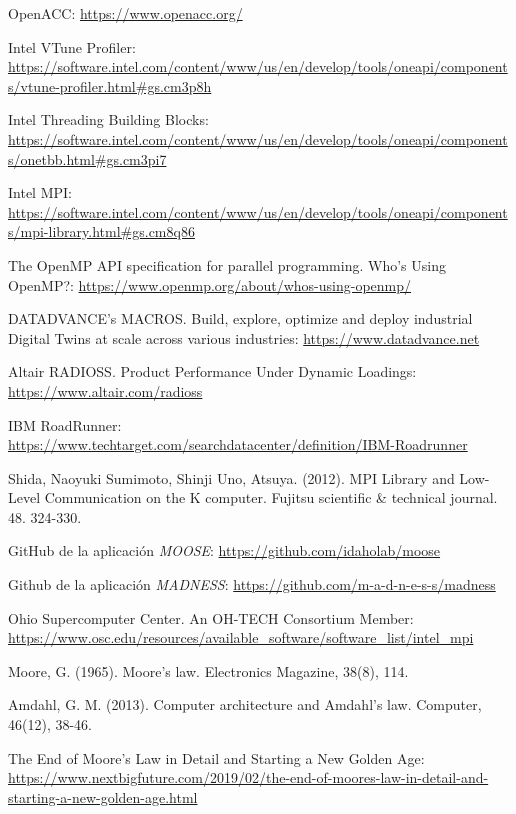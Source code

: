 \documentclass[a4paper,12pt]{article}
\begin{document}
\begin{thebibliography}{}

OpenACC: \url{https://www.openacc.org/}

Intel VTune Profiler: \url{https://software.intel.com/content/www/us/en/develop/tools/oneapi/components/vtune-profiler.html#gs.cm3p8h}

Intel Threading Building Blocks: \url{https://software.intel.com/content/www/us/en/develop/tools/oneapi/components/onetbb.html#gs.cm3pi7}

Intel MPI: \url{https://software.intel.com/content/www/us/en/develop/tools/oneapi/components/mpi-library.html#gs.cm8q86}

The OpenMP API specification for parallel programming. Who’s Using OpenMP?:
\url{https://www.openmp.org/about/whos-using-openmp/}

DATADVANCE’s MACROS. Build, explore, optimize and deploy industrial Digital Twins at scale across various industries: \url{https://www.datadvance.net}

Altair RADIOSS. Product Performance Under Dynamic Loadings:
\url{https://www.altair.com/radioss}

IBM RoadRunner: \url{https://www.techtarget.com/searchdatacenter/definition/IBM-Roadrunner}

Shida, Naoyuki Sumimoto, Shinji Uno, Atsuya. (2012). MPI Library and Low-Level Communication on the K computer. Fujitsu scientific \& technical journal. 48. 324-330.

GitHub de la aplicación {\it MOOSE}: \url{https://github.com/idaholab/moose}

Github de la aplicación {\it MADNESS}: \url{https://github.com/m-a-d-n-e-s-s/madness}

Ohio Supercomputer Center. An OH-TECH Consortium Member: \url{https://www.osc.edu/resources/available_software/software_list/intel_mpi}

Moore, G. (1965). Moore’s law. Electronics Magazine, 38(8), 114.

Amdahl, G. M. (2013). Computer architecture and Amdahl's law. Computer, 46(12), 38-46.

The End of Moore’s Law in Detail and Starting a New Golden Age: \url{https://www.nextbigfuture.com/2019/02/the-end-of-moores-law-in-detail-and-starting-a-new-golden-age.html}


\end{thebibliography}
\end{document}
